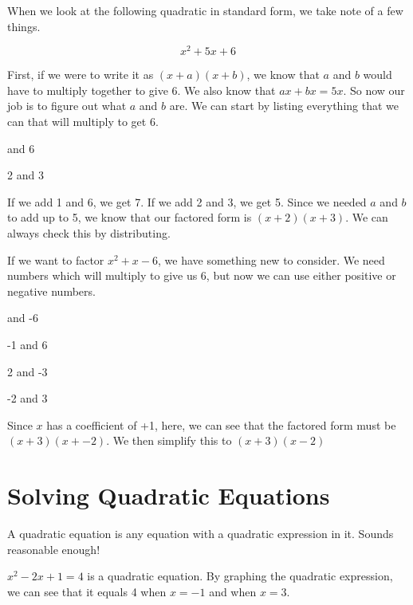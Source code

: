 \begin{example}

When we look at the following quadratic in standard form, we take note of a few things.

$$x^2 + 5x + 6$$

First, if we were to write it as $(x + a)(x + b)$, we know that $a$ and $b$ would have to multiply together to give 6.  We also know that $ax + bx = 5x$.  So now our job is to figure out what $a$ and $b$ are.  We can start by listing everything that we can that will multiply to get 6.

 and 6

2 and 3

\bigskip
If we add 1 and 6, we get 7.  If we add 2 and 3, we get 5.  Since we needed $a$ and $b$ to add up to 5, we know that our factored form is $(x + 2)(x + 3)$.  We can always check this by distributing. 

\end{example}

\begin{example}

If we want to factor $x^2 +x - 6$, we have something new to consider.  We need numbers which will multiply to give us 6, but now we can use either positive or negative numbers.

 and -6

-1 and 6

2 and -3

-2 and 3

\bigskip
Since $x$ has a coefficient of +1, here, we can see that the factored form must be $(x+3)(x + -2)$.  We then simplify this to $(x+3)(x - 2)$

\end{example}

\newpage

\section*{Solving Quadratic Equations}

A quadratic equation is any equation with a quadratic expression in it.  Sounds reasonable enough!

\begin{example}
$x^2 - 2x + 1 = 4$ is a quadratic equation.  By graphing the quadratic expression, we can see that it equals 4 when $x = -1$ and when $x = 3$.

\end{example}


